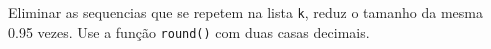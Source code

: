 \documentclass[12pt,varwidth=16cm,border=1pt]{standalone}
\begin{document}
Eliminar as sequencias que se repetem na lista \verb+k+, reduz o tamanho da mesma 0.95 vezes. Use a função \verb+round()+ com duas casas decimais.

\questiomfalse
\end{document}
